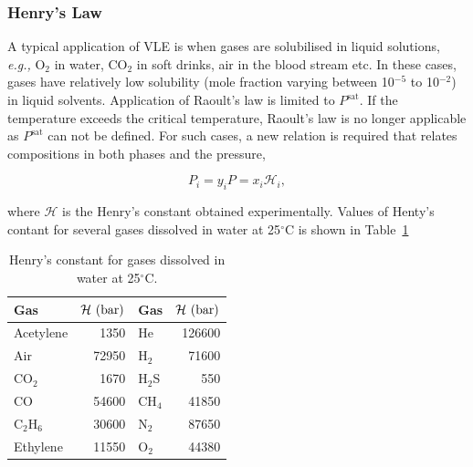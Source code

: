 \documentclass[12pts,a4paper,amsmath,amssymb,floatfix]{article}%
\newcommand{\eg}{{\it e.g., }}
\begin{document}
\begin{subequations}
\end{subequations}

\subsubsection{Henry's Law}\label{Section:04:HenryLaw}

A typical application of VLE is when gases are solubilised in liquid solutions, \eg O$_{2}$ in water, CO$_{2}$ in soft drinks, air in the blood stream etc. In these cases, gases have relatively low solubility (mole fraction varying between 10$^{-5}$ to 10$^{-2}$) in liquid solvents. Application of Raoult's law is limited to $P^{\text{sat}}$. If the temperature exceeds the critical temperature, Raoult's law is no longer applicable as $P^{\text{sat}}$ can not be defined. For such cases, a new relation is required that relates compositions in both phases and the pressure,
\begin{shaded}
  \begin{equation}
      P_{i} = y_{i}P = x_{i}\mathcal{H}_{i},\label{Mod04_HenryLaw} 
  \end{equation}
\end{shaded}
\noindent where $\mathcal{H}$ is the Henry's constant obtained experimentally. Values of Henty's contant for several gases dissolved in water at 25$^{\circ}$C is shown in Table~\ref{Mod04_HenryLawTable}
 \begin{table}
  \begin{center}
    \begin{tabular}{l r || l r }
      \hline
       {\bf Gas}    &  ${\bf \mathcal{H}\text{ (bar)}}$ & {\bf Gas}    &  ${\bf \mathcal{H}\text{ (bar)}}$ \\
      \hline
         Acetylene  &   1350                            & He           &  126600 \\
         Air        &   72950                           & H$_{2}$      &  71600  \\
         CO$_{2}$    & 1670                              & H$_{2}$S     & 550 \\
         CO         &  54600                            &  CH$_{4}$    &  41850 \\
         C$_{2}$H$_{6}$ & 30600                          &  N$_{2}$     & 87650  \\
         Ethylene  & 11550                              & O$_{2}$      & 44380 \\
      \hline
    \end{tabular}
    \caption{Henry's constant for gases dissolved in water at 25$^{\circ}$C.}\label{Mod04_HenryLawTable}
  \end{center}
\end{table}
\end{document}
